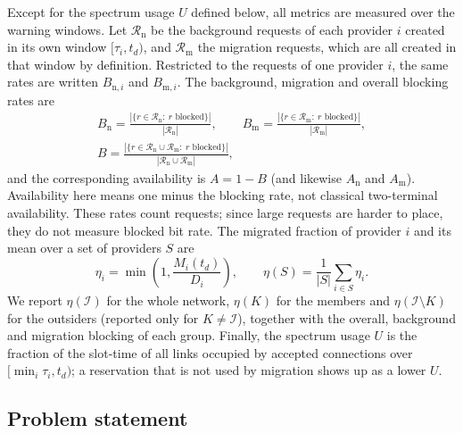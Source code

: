 \documentclass[11pt,a4paper]{article}
\theoremstyle{definition}
\begin{document}
Except for the spectrum usage $U$ defined below, all metrics are measured over the warning windows.
Let $\mathcal{R}_\mathrm{n}$ be the background requests of each provider $i$ created in its own window $[\tau_i,t_d)$, and $\mathcal{R}_\mathrm{m}$ the migration requests, which are all created in that window by definition. Restricted to the requests of one provider $i$, the same rates are written $B_{\mathrm{n},i}$ and $B_{\mathrm{m},i}$.
The background, migration and overall blocking rates are
\begin{gather}
  B_\mathrm{n}=\frac{|\{r\in\mathcal{R}_\mathrm{n}:\ r \text{ blocked}\}|}{|\mathcal{R}_\mathrm{n}|},\qquad
  B_\mathrm{m}=\frac{|\{r\in\mathcal{R}_\mathrm{m}:\ r \text{ blocked}\}|}{|\mathcal{R}_\mathrm{m}|},\\
  B=\frac{|\{r\in\mathcal{R}_\mathrm{n}\cup\mathcal{R}_\mathrm{m}:\ r \text{ blocked}\}|}{|\mathcal{R}_\mathrm{n}\cup\mathcal{R}_\mathrm{m}|},
\end{gather}
and the corresponding availability is $A=1-B$ (and likewise $A_\mathrm{n}$ and $A_\mathrm{m}$).
Availability here means one minus the blocking rate, not classical two-terminal availability.
These rates count requests; since large requests are harder to place, they do not measure blocked bit rate.
The migrated fraction of provider $i$ and its mean over a set of providers $S$ are
\begin{equation}
  \eta_i=\min\!\left(1,\frac{M_i(t_d)}{D_i}\right),\qquad
  \eta(S)=\frac{1}{|S|}\sum_{i\in S}\eta_i .
\end{equation}
We report $\eta(\mathcal{I})$ for the whole network, $\eta(K)$ for the members and $\eta(\mathcal{I}\setminus K)$ for the outsiders (reported only for $K\neq\mathcal{I}$), together with the overall, background and migration blocking of each group.
Finally, the spectrum usage $U$ is the fraction of the slot-time of all links occupied by accepted connections over $[\min_i\tau_i,t_d)$; a reservation that is not used by migration shows up as a lower $U$.

\subsection{Problem statement}
\end{document}
